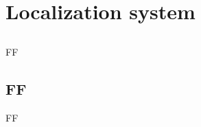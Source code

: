\chapter{Localization system} \label{chap:localization-system}



\section*{}

FF



\section{FF}

FF
